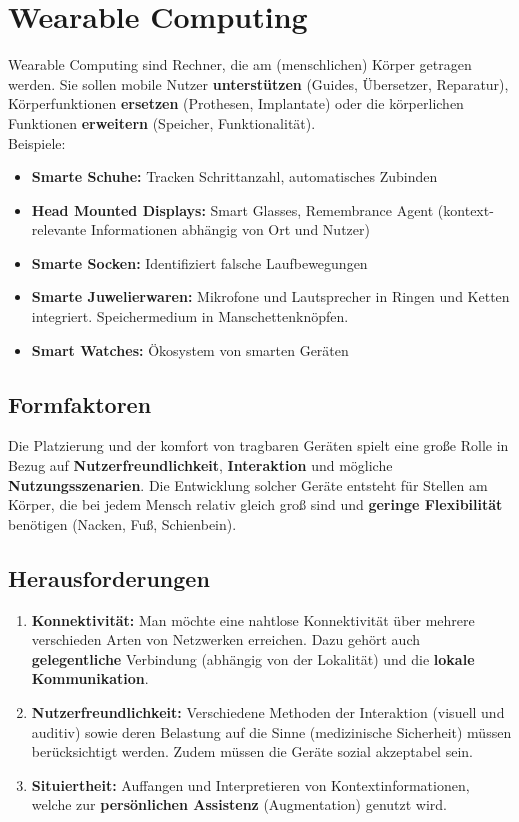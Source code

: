\documentclass[a4paper]{article}
\begin{document}
\section{Wearable Computing}
Wearable Computing sind Rechner, die am (menschlichen) Körper getragen werden. Sie sollen mobile Nutzer \textbf{unterstützen} (Guides, Übersetzer, Reparatur), Körperfunktionen \textbf{ersetzen} (Prothesen, Implantate) oder die körperlichen Funktionen \textbf{erweitern} (Speicher, Funktionalität).\\

Beispiele:
\begin{itemize}
	\item \textbf{Smarte Schuhe:} Tracken Schrittanzahl, automatisches Zubinden
	\item \textbf{Head Mounted Displays:}  Smart Glasses, Remembrance Agent (kontext-relevante Informationen abhängig von Ort und Nutzer)
	\item \textbf{Smarte Socken:} Identifiziert falsche Laufbewegungen
	\item \textbf{Smarte Juwelierwaren:} Mikrofone und Lautsprecher in Ringen und Ketten integriert. Speichermedium in Manschettenknöpfen.
	\item \textbf{Smart Watches:} Ökosystem von smarten Geräten
\end{itemize}
\subsection{Formfaktoren}
Die Platzierung und der komfort von tragbaren Geräten spielt eine große Rolle in Bezug auf \textbf{Nutzerfreundlichkeit}, \textbf{Interaktion} und mögliche \textbf{Nutzungsszenarien}. Die Entwicklung solcher Geräte entsteht für Stellen am Körper, die bei jedem Mensch relativ gleich groß sind und \textbf{geringe Flexibilität} benötigen (Nacken, Fuß, Schienbein).
\subsection{Herausforderungen}
\begin{enumerate}
	\item \textbf{Konnektivität:} Man möchte eine nahtlose Konnektivität über mehrere verschieden Arten von Netzwerken erreichen. Dazu gehört auch \textbf{gelegentliche} Verbindung (abhängig von der Lokalität) und die \textbf{lokale Kommunikation}.
	\item \textbf{Nutzerfreundlichkeit:} Verschiedene Methoden der Interaktion (visuell und auditiv) sowie deren Belastung auf die Sinne (medizinische Sicherheit) müssen berücksichtigt werden. Zudem müssen die Geräte sozial akzeptabel sein.
	\item \textbf{Situiertheit:} Auffangen und Interpretieren von Kontextinformationen, welche zur \textbf{persönlichen Assistenz} (Augmentation) genutzt wird.
\end{enumerate}
\end{document}
